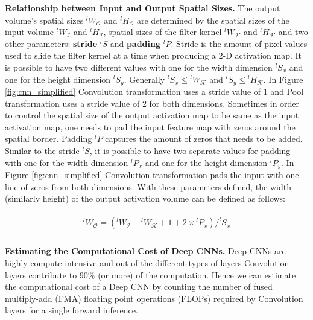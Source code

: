 \vspace{2mm}
\noindent \textbf{Relationship between Input and Output Spatial Sizes.}
The output volume's spatial sizes $^lW_{\mathcal{O}}$ and $^lH_{\mathcal{O}}$ are determined by the spatial sizes of the input volume $^lW_{\mathcal{I}}$ and $^lH_{\mathcal{I}}$, spatial sizes of the filter kernel $^lW_\mathcal{K}$ and $^lH_\mathcal{K}$ and two other parameters: \textbf{stride} $^lS$ and \textbf{padding} $^lP$.
Stride is the amount of pixel values used to slide the filter kernel at a time when producing a 2-D activation map.
It is possible to have two different values with one for the width dimension $^lS_x$ and one for the height dimension $^lS_y$.
Generally $^lS_x \leq {}^lW_\mathcal{K}$ and $^lS_y \leq {}^lH_\mathcal{K}$.
In Figure \ref{fig:cnn_simplified} Convolution transformation uses a stride value of 1 and Pool transformation uses a stride value of 2 for both dimensions.
Sometimes in order to control the spatial size of the output activation map to be same as the input activation map, one needs to pad the input feature map with zeros around the spatial border.
Padding $^lP$ captures the amount of zeros that needs to be added.
Similar to the stride $^lS$, it is possible to have two separate values for padding with one for the width dimension $^lP_x$ and one for the height dimension $^lP_y$.
In Figure \ref{fig:cnn_simplified} Convolution transformation pads the input with one line of zeros from both dimensions.
With these parameters defined, the width (similarly height) of the output activation volume can be defined as follows:

\begin{align}
\begin{split}
^lW_{\mathcal{O}} = (^lW_{\mathcal{I}} - {}^lW_\mathcal{K} + 1 + 2\times {}^lP_x)/^lS_x \\
\end{split}
\end{align}

\vspace{2mm}
\noindent \textbf{Estimating the Computational Cost of Deep CNNs.}
Deep CNNs are highly compute intensive and out of the different types of layers Convolution layers contribute to $90\%$ (or more) of the computation.
Hence we can estimate the computational cost of a Deep CNN by counting the number of fused multiply-add (FMA) floating point operations (FLOPs) required by Convolution layers for a single forward inference.

